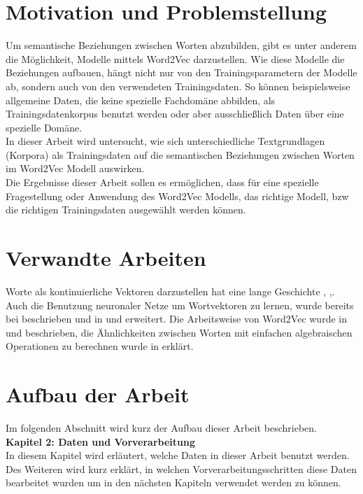 \documentclass[12pt,a4paper]{report}
\begin{document}
	\section{Motivation und Problemstellung}
	  
	
	Um semantische Beziehungen zwischen Worten abzubilden, gibt es unter anderem die Möglichkeit, Modelle mittels Word2Vec darzustellen. Wie diese Modelle die Beziehungen aufbauen, hängt nicht nur von den Trainingsparametern der Modelle ab, sondern auch von den verwendeten Trainingsdaten. So können beispielsweise allgemeine Daten, die keine spezielle Fachdomäne abbilden, als Trainingsdatenkorpus benutzt werden oder aber ausschließlich Daten über eine spezielle Domäne. \\		
	In dieser Arbeit wird untersucht, wie sich unterschiedliche Textgrundlagen (Korpora) als Trainingsdaten auf die semantischen Beziehungen zwischen Worten im Word2Vec Modell auswirken. \\
	Die Ergebnisse dieser Arbeit sollen es ermöglichen, dass für eine spezielle Fragestellung oder Anwendung des Word2Vec Modells, das richtige Modell, bzw die richtigen Trainingsdaten ausgewählt werden können.\\
	


	\section{Verwandte Arbeiten}
	Worte als kontinuierliche Vektoren darzustellen hat eine lange Geschichte \citep{Hinton86}, \cite{williams1986learning},\cite{elman1990finding}. Auch die Benutzung neuronaler Netze um Wortvektoren zu lernen, wurde bereits bei \citep{bengio2003neural} beschrieben und in \cite{mikolovMaster} und \cite{mikolov2009neural} erweitert. Die Arbeitsweise von Word2Vec wurde in \citep{DBLP:journals/corr/abs-1301-3781} und \citep{DBLP:journals/corr/MikolovSCCD13} beschrieben, die Ähnlichkeiten zwischen Worten mit einfachen algebraischen Operationen zu berechnen wurde in \citep{DBLP:conf/naacl/MikolovYZ13} erklärt.
	
	
	
	\newpage
	\section{Aufbau der Arbeit}
	Im folgenden Abschnitt wird kurz der Aufbau dieser Arbeit beschrieben.\\
	
	\textbf{Kapitel 2: Daten und Vorverarbeitung}\\
	In diesem Kapitel wird erläutert, welche Daten in dieser Arbeit benutzt werden. Des Weiteren wird kurz erklärt, in welchen Vorverarbeitungsschritten diese Daten bearbeitet wurden um in den nächsten Kapiteln verwendet werden zu können.\\
	
\end{document}
